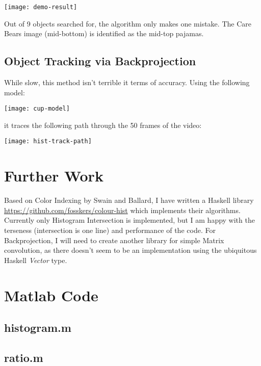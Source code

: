\documentclass{article}
\begin{document}
\begin{center}
  \texttt{[image: demo-result]}
\end{center}

Out of 9 objects searched for, the algorithm only makes one mistake.
The Care Bears image (mid-bottom) is identified as the mid-top pajamas.

\subsection{Object Tracking via Backprojection}
While slow, this method isn't terrible it terms of accuracy.
Using the following model:

\begin{center}
  \texttt{[image: cup-model]}
\end{center}

it traces the following path through the 50 frames of the video:

\begin{center}
  \texttt{[image: hist-track-path]}
\end{center}

\section{Further Work}
Based on Color Indexing by Swain and Ballard, I have written a Haskell
library \url{https://github.com/fosskers/colour-hist} which implements their
algorithms. Currently only Histogram Intersection is implemented, but I am
happy with the terseness (intersection is one line) and performance of the
code. For Backprojection, I will need to create another library for simple
Matrix convolution, as there doesn't seem to be an implementation using the
ubiquitous Haskell
\emph{Vector} type.

\section{Matlab Code}

\subsection{histogram.m}



\subsection{ratio.m}
\end{document}
